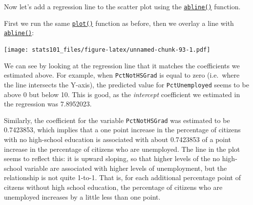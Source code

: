 \documentclass[]{article}
\newenvironment{Shaded}{\begin{snugshade}}{\end{snugshade}}
\newcommand{\DataTypeTok}[1]{\textcolor[rgb]{0.13,0.29,0.53}{#1}}
\newcommand{\DecValTok}[1]{\textcolor[rgb]{0.00,0.00,0.81}{#1}}
\newcommand{\KeywordTok}[1]{\textcolor[rgb]{0.13,0.29,0.53}{\textbf{#1}}}
\newcommand{\NormalTok}[1]{#1}
\newcommand{\OperatorTok}[1]{\textcolor[rgb]{0.81,0.36,0.00}{\textbf{#1}}}
\newcommand{\OtherTok}[1]{\textcolor[rgb]{0.56,0.35,0.01}{#1}}
\newcommand{\StringTok}[1]{\textcolor[rgb]{0.31,0.60,0.02}{#1}}
\begin{document}
Now let's add a regression line to the scatter plot using the \href{http://bit.ly/R_abline}{\texttt{abline()}} function.

First we run the same \href{http://bit.ly/R_plot}{\texttt{plot()}} function as before, then we overlay a line with \href{http://bit.ly/R_abline}{\texttt{abline()}}:

\begin{Shaded}
\end{Shaded}

\texttt{[image: stats101\_files/figure-latex/unnamed-chunk-93-1.pdf]}

We can see by looking at the regression line that it matches the coefficients we estimated above. For example, when \texttt{PctNotHSGrad} is equal to zero (i.e.~where the line intersects the Y-axis), the predicted value for \texttt{PctUnemployed} seems to be above 0 but below 10. This is good, as the \emph{intercept} coefficient we estimated in the regression was 7.8952023.

Similarly, the coefficient for the variable \texttt{PctNotHSGrad} was estimated to be 0.7423853, which implies that a one point increase in the percentage of citizens with no high-school education is associated with about 0.7423853 of a point increase in the percentage of citizens who are unemployed. The line in the plot seems to reflect this: it is upward sloping, so that higher levels of the no high-school variable are associated with higher levels of unemployment, but the relationship is not quite 1-to-1. That is, for each additional percentage point of citzens without high school education, the percentage of citizens who are unemployed increases by a little less than one point.
\end{document}
